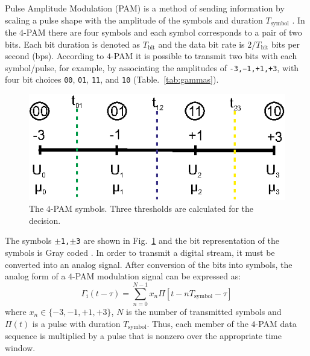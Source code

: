 \documentclass[journal]{IEEEtran}
\begin{document}
Pulse Amplitude Modulation (PAM) is a  method of sending information by scaling a pulse shape with the amplitude of the symbols and  duration $T_\text{symbol}$ \cite{johnson2011software}. 
In the $4$-PAM there are  four symbols and each symbol corresponds to  a pair of two bits.  
%
Each bit duration is denoted as $T_\text{bit}$ 
and the data bit rate is $2/T_\text{bit}$ bits per second (bps). 
%
According to $4$-PAM it is possible to transmit two bits with each symbol/pulse, for example, by associating the amplitudes of  \texttt{-3,−1,+1,+3}, with  four  bit choices \texttt{00}, \texttt{01}, \texttt{11}, and \texttt{10} (Table.~\ref{tab:gammas}).
%
\begin{figure}[t]
\centering
\includegraphics[width=0.7\columnwidth]{Figures/Fig8.eps}
\caption{The $4$-PAM symbols. Three thresholds are calculated for the decision.}
\label{fig:PAMsymbols}
\end{figure}
%
The symbols \texttt{$\pm$1,$\pm$3} are  shown in Fig.~\ref{fig:PAMsymbols} and the bit representation of the symbols is Gray coded \cite{proakis2008digital}. 
%
In order to transmit a digital stream, it must be converted into an analog signal. 
%
After conversion of the bits into symbols, the  analog form of a $4$-PAM modulation signal can be expressed as:
%
\begin{equation}
\Gamma_\text{i} (t-\tau) =\sum_{n=0}^{N-1} x_n \Pi[t- nT_\text{symbol} -\tau]
\label{eq:pulses_gamma}
\end{equation}
%
where $ x_n\in \lbrace -3,-1,+1,+3 \rbrace$, $N$ is the number of transmitted symbols and $\Pi(t)$ is a pulse with duration $T_\text{symbol}$.
%
Thus, each member of the $4$-PAM data sequence is multiplied by a pulse that is nonzero over the appropriate time window.
\end{document}
